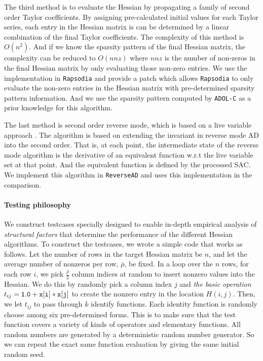 \documentclass[12pt]{article}
\begin{document}
The third method is to evaluate the Hessian by propagating a family of second order Taylor coefficients\cite{griewank2000evaluating}. By assigning pre-calculated initial values for each Taylor series, each entry in the Hessian matrix is can be determined by a linear combination of the final Taylor coefficients. The complexity of this method is $O(n^2)$. And if we know the sparsity pattern of the final Hessian matrix, the complexity can be reduced to $O(nnz)$ where $nnz$ is the number of non-zeros in the final Hessian matrix by only evaluating those non-zero entries. We use the implementation in {\tt Rapsodia} \cite{charpentier2009fast} and provide a patch which allows {\tt Rapsodia} to only evaluate the non-zero entries in the Hessian matrix with pre-determined sparsity pattern information. And we use the sparsity pattern computed by {\tt ADOL-C} as a prior knowledge for this algorithm.

The last method is second order reverse mode, which is based on a live variable approach \cite{wang2016capitalizing}. The algorithm is based on extending the invariant in reverse mode AD into the second order. That is, at each point, the intermediate state of the reverse mode algorithm is the derivative of an equivalent function w.r.t the live variable set at that point. And the equivalent function is defined by the processed SAC. We implement this algorithm in  {\tt ReverseAD} and uses this implementation in the comparison.

\paragraph{Testing philosophy}
We construct testcases specially designed to enable in-depth empirical analysis of {\em structural factors} that determine the performance of the  different Hessian algorithms. 
To construct the testcases, we wrote a simple code that works as follows. 
Let the number of rows in the target Hessian matrix be $n$, and let the average number of nonzeros per row, $\bar{\rho}$, be fixed.
In a loop over the $n$ rows, for each row $i$, we pick $\frac{\bar{\rho}}{2}$ column indices at random to insert nonzero values into the Hessian. We do this by randomly pick a column index $j$ and {\em the basic operation} $t_{ij} = \tt 1.0+x[i]*x[j]$ to create the nonzero entry in the location $H(i,j)$. 
Then, we let $t_{ij}$ to pass through $k$ identify functions. Each identity function is randomly choose among six pre-determined forms. This is to make sure that the test function covers a variety of kinds of operators and elementary functions.
All random numbers are generated by a deterministic random number generator. So we can repeat the exact same function evaluation by giving the same initial random seed.
\end{document}
